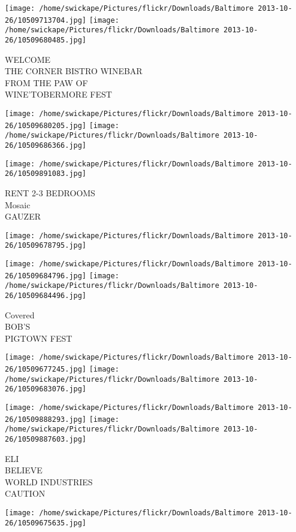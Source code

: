 \documentclass[10pt,letterpaper]{article}
\begin{document}
\texttt{[image: /home/swickape/Pictures/flickr/Downloads/Baltimore 2013-10-26/10509713704.jpg]}
\texttt{[image: /home/swickape/Pictures/flickr/Downloads/Baltimore 2013-10-26/10509680485.jpg]}

WELCOME\\
THE CORNER BISTRO WINEBAR\\
FROM THE PAW OF\\
WINE'TOBERMORE FEST
\pagebreak

\texttt{[image: /home/swickape/Pictures/flickr/Downloads/Baltimore 2013-10-26/10509680205.jpg]}
\texttt{[image: /home/swickape/Pictures/flickr/Downloads/Baltimore 2013-10-26/10509686366.jpg]}

\texttt{[image: /home/swickape/Pictures/flickr/Downloads/Baltimore 2013-10-26/10509891083.jpg]}

RENT 2{-}3 BEDROOMS\\
Mosaic\\
GAUZER
\pagebreak

\texttt{[image: /home/swickape/Pictures/flickr/Downloads/Baltimore 2013-10-26/10509678795.jpg]}

\vspace{0.25in}
\texttt{[image: /home/swickape/Pictures/flickr/Downloads/Baltimore 2013-10-26/10509684796.jpg]}
\texttt{[image: /home/swickape/Pictures/flickr/Downloads/Baltimore 2013-10-26/10509684496.jpg]}

Covered\\
BOB'S\\
PIGTOWN FEST
\pagebreak

\texttt{[image: /home/swickape/Pictures/flickr/Downloads/Baltimore 2013-10-26/10509677245.jpg]}
\texttt{[image: /home/swickape/Pictures/flickr/Downloads/Baltimore 2013-10-26/10509683076.jpg]}

\texttt{[image: /home/swickape/Pictures/flickr/Downloads/Baltimore 2013-10-26/10509888293.jpg]}
\texttt{[image: /home/swickape/Pictures/flickr/Downloads/Baltimore 2013-10-26/10509887603.jpg]}

ELI\\
BELIEVE\\
WORLD INDUSTRIES\\
CAUTION
\pagebreak

\texttt{[image: /home/swickape/Pictures/flickr/Downloads/Baltimore 2013-10-26/10509675635.jpg]}
\end{document}
